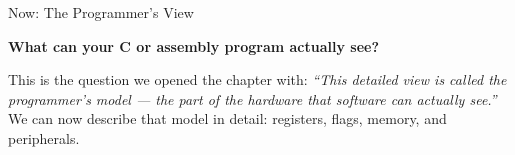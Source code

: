 \documentclass[9pt,aspectratio=169,xcolor=table]{beamer}
\begin{document}
\begin{frame}{Now: The Programmer's View}
    \leavevmode
    \begin{center}
    \end{center}

    \vspace{3mm}
    {\small\centering \textbf{What can your C or assembly program actually see?}\par}

    \vspace{4mm}
    {\small This is the question we opened the chapter with: \emph{``This detailed view is called the programmer's model --- the part of the hardware that software can actually see.''} We can now describe that model in detail: registers, flags, memory, and peripherals.}
\end{frame}
\end{document}
